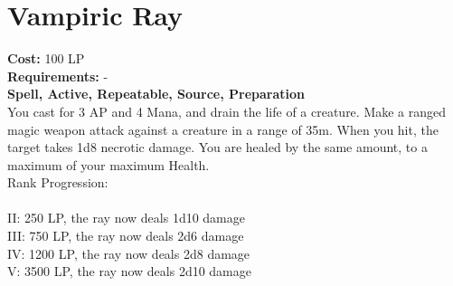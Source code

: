 \section{Vampiric Ray}\label{spell:vampiricRay}
\textbf{Cost:} 100 LP\\
\textbf{Requirements:} -\\
\textbf{Spell, Active, Repeatable, Source, Preparation}\\
You cast for 3 AP and 4 Mana, and drain the life of a creature.
Make a ranged magic weapon attack against a creature in a range of 35m.
When you hit, the target takes 1d8 necrotic damage.
You are healed by the same amount, to a maximum of your maximum Health.
\\
Rank Progression:\\
\\
II: 250 LP, the ray now deals 1d10 damage\\
III: 750 LP, the ray now deals 2d6 damage\\
IV: 1200 LP, the ray now deals 2d8 damage\\
V: 3500 LP, the ray now deals 2d10 damage\\